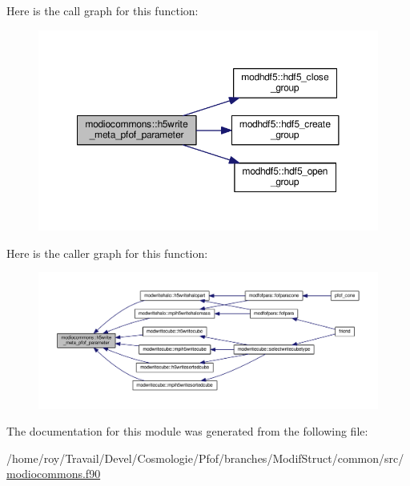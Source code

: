 Here is the call graph for this function\-:\nopagebreak
\begin{figure}[H]
\begin{center}
\leavevmode
\includegraphics[width=350pt]{classmodiocommons_a6c7b87aedd57a36d2f5b643cb3fc7c12_cgraph}
\end{center}
\end{figure}




Here is the caller graph for this function\-:\nopagebreak
\begin{figure}[H]
\begin{center}
\leavevmode
\includegraphics[width=350pt]{classmodiocommons_a6c7b87aedd57a36d2f5b643cb3fc7c12_icgraph}
\end{center}
\end{figure}




The documentation for this module was generated from the following file\-:\begin{DoxyCompactItemize}
\item 
/home/roy/\-Travail/\-Devel/\-Cosmologie/\-Pfof/branches/\-Modif\-Struct/common/src/\hyperlink{modiocommons_8f90}{modiocommons.\-f90}\end{DoxyCompactItemize}
